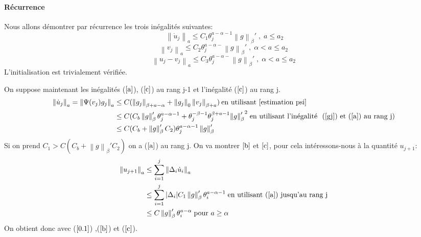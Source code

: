 \documentclass[11pt,a4paper]{article}
\begin{document}
\paragraph{Récurrence}
Nous allons démontrer par récurrence les trois inégalités suivantes:
\begin{equation} \label{a}
\; \left\|\dot{u}_j \right\|_a \leq C_1 \theta^{a-\alpha-1}_j \left\|g \right\|_\beta' \; , \; a \leq a_2 
\end{equation} 
\begin{equation} \label{b}
\left\| v_j \right\|_a \leq C_2 \theta^{a-\alpha-}_j \left\|g \right\|_\beta' \; , \; \alpha < a \leq a_2  
\end{equation}
\begin{equation}\label{c} 
\left\|u_j - v_j \right\|_a \leq C_3 \theta^{a-\alpha-}_j \left\|g \right\|_\beta' \; , \; \alpha < a \leq a_2  
\end{equation}
L'initialisation est trivialement vérifiée.

On suppose maintenant les inégalités ($\ref{a}$), ($\ref{c}$) au rang j-1 et l'inégalité ($\ref{c}$) au rang j.
\[
\begin{aligned}
\left\|\dot{u}_j \right\|_a = \left\|\Psi(v_j)g_j \right\|_a &\leq C (\left\|g_j \right\|_{\beta + a - \alpha} + \left\|g_j \right\|_0 \left\|v_j \right\|_{\beta + a}) \: \text{en utilisant}  \ \ref{estimation psi} \\
&\leq C( C_b \left\|g \right\|_\beta' \theta^{a-\alpha-1}_j + \theta^{-\beta-1}_j \theta^{\beta+a-1}_j {\left\|g \right\|_\beta'}^2 \; \text{en utilisant l'inégalité } \ (\ref{gj}) \text{ et} \ (\ref{a}) \ \text{au rang j}) \\
&\leq C (C_b + \left\|g \right\|_\beta' C_2) \theta^{a-\alpha-1}_j \left\|g \right\|_\beta'
\end{aligned}
\]
Si on prend $C_1 > C (C_b + \left\|g \right\|_\beta' C_2)$ on a ($\ref{a}$) au rang j.
On va montrer $\ref{b}$ et $\ref{c}$, pour cela intéressons-nous à la quantité $u_{j+1}$:
\[
\begin{aligned}
\left\|u_{j+1} \right\|_a &\leq \sum^j_{i=1} \left\|\Delta_i \dot{u}_i  \right\|_a \\ 
&\leq \sum^j_{i=1} |\Delta_i| C_1 \left\|g \right\|_\beta' \theta^{a-\alpha-1}_i \; \text{en utilisant} \ (\ref{a}) \ \text{jusqu'au rang j} \\
&\leq C \left\|g \right\|_\beta' \theta^{a-\alpha}_i \; \text{pour } a \geq \alpha
\end{aligned}
\]
On obtient donc avec ($\ref{0.1}$) ,($\ref{b}$) et ($\ref{c}$).
\end{document}
